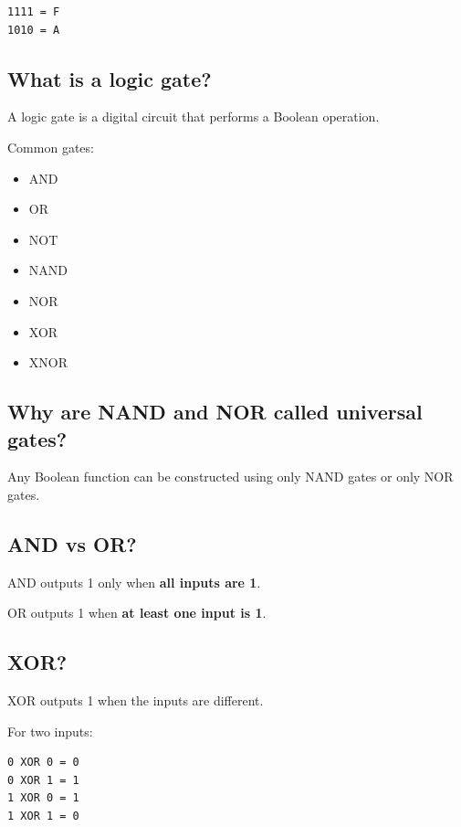 \begin{lstlisting}
1111 = F
1010 = A
\end{lstlisting}

\medskip

\subsection{What is a logic gate?}

A logic gate is a digital circuit that performs a Boolean operation.

Common gates:

\begin{itemize}
  \item AND
  \item OR
  \item NOT
  \item NAND
  \item NOR
  \item XOR
  \item XNOR
\end{itemize}

\medskip

\subsection{Why are NAND and NOR called universal gates?}

Any Boolean function can be constructed using only NAND gates or only NOR gates.

\medskip

\subsection{AND vs OR?}

AND outputs 1 only when \textbf{all inputs are 1}.

OR outputs 1 when \textbf{at least one input is 1}.

\medskip

\subsection{XOR?}

XOR outputs 1 when the inputs are different.

For two inputs:

\begin{lstlisting}
0 XOR 0 = 0
0 XOR 1 = 1
1 XOR 0 = 1
1 XOR 1 = 0
\end{lstlisting}

